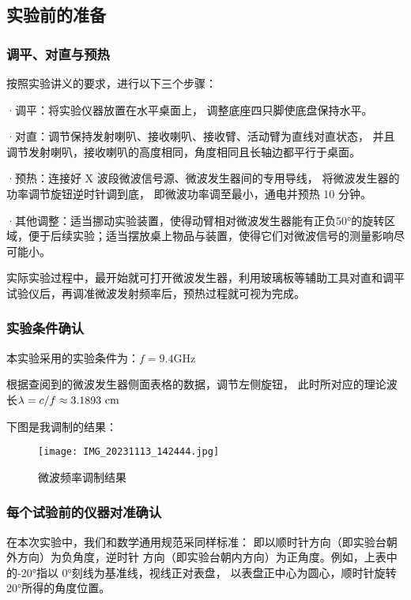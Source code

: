 \documentclass[11pt]{article}
\begin{document}
\subsection{实验前的准备}

\subsubsection{调平、对直与预热}

按照实验讲义的要求，进行以下三个步骤：

·调平：将实验仪器放置在水平桌面上，
调整底座四只脚使底盘保持水平。

·对直：调节保持发射喇叭、接收喇叭、接收臂、活动臂为直线对直状态，
并且调节发射喇叭，接收喇叭的高度相同，角度相同且长轴边都平行于桌面。

·预热：连接好 X 波段微波信号源、微波发生器间的专用导线，
将微波发生器的功率调节旋钮逆时针调到底，
即微波功率调至最小，通电并预热 10 分钟。

·其他调整：适当挪动实验装置，使得动臂相对微波发生器能有正负50°的旋转区域，便于后续实验；适当摆放桌上物品与装置，使得它们对微波信号的测量影响尽可能小。

实际实验过程中，最开始就可打开微波发生器，利用玻璃板等辅助工具对直和调平试验仪后，再调准微波发射频率后，预热过程就可视为完成。


\subsubsection{实验条件确认}

本实验采用的实验条件为：$f=9.4$GHz

根据查阅到的微波发生器侧面表格的数据，调节左侧旋钮，
此时所对应的理论波长$\lambda=c/f\approx 3.1893\,\, \rm {cm}$

下图是我调制的结果：

\begin{figure}[H]
    \centering
    \texttt{[image: IMG\_20231113\_142444.jpg]}
    \caption{微波频率调制结果}
\end{figure}


\subsubsection{每个试验前的仪器对准确认}

在本次实验中，我们和数学通用规范采同样标准：
即以顺时针方向（即实验台朝外方向）为负角度，逆时针
方向（即实验台朝内方向）为正角度。例如，上表中的-20°指以 0°刻线为基准线，视线正对表盘，
以表盘正中心为圆心，顺时针旋转 20°所得的角度位置。
\end{document}
